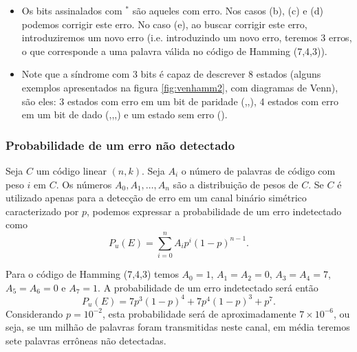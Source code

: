 \begin{frame}[allowframebreaks]
\begin{itemize}
  \item Os bits assinalados com $ ^\ast$ são aqueles com erro. Nos casos (b), (c) e (d) podemos corrigir este erro.
	No caso (e), ao buscar corrigir este erro, introduziremos um novo erro (i.e. introduzindo um novo erro,
	teremos 3 erros, o que corresponde a uma palavra válida no código de Hamming (7,4,3)).

  \item Note que a síndrome com 3 bits é capaz de descrever 8 estados (alguns exemplos apresentados na figura \ref{fig:venhamm2}, com diagramas de Venn),
    são eles: 3 estados com erro em um bit de paridade (\xmark\cmark\cmark,\cmark\xmark\cmark,\cmark\cmark\xmark), 
    4 estados com erro em um bit de dado (\xmark\xmark\cmark,\cmark\xmark\xmark,\xmark\cmark\xmark,\xmark\xmark\xmark) e um estado sem erro (\cmark\cmark\cmark).
  \end{itemize}
\end{frame}

\begin{frame}[allowframebreaks]
  \frametitle{Probabilidade de um erro não detectado}
  Seja $C$ um código linear $(n,k)$. Seja $A_i$ o número de palavras de código com peso $i$ em $C$.
  Os números $A_0,A_1,\ldots,A_n$ são a distribuição de pesos de $C$.
  Se $C$ é utilizado apenas para a detecção de erro em um canal binário simétrico caracterizado por $p$, podemos expressar
  a probabilidade de um erro indetectado como
  \begin{equation}
    P_u(E) = \sum_{i=0}^n A_i p^i (1-p)^{n-1}.
  \end{equation}

  Para o código de Hamming (7,4,3) temos $A_0 = 1$, $A_1 = A_2 = 0$, $A_3 = A_4 = 7$, $A_5 = A_6 = 0$ e $A_7 = 1$.
  A probabilidade de um erro indetectado será então
  \begin{equation}
    P_u(E) = 7 p^3(1-p)^4 + 7 p^4 (1-p)^3 + p^7.
  \end{equation}
  Considerando $p=10^{-2}$, esta probabilidade será de aproximadamente $7 \times 10^{-6}$, ou seja, se um milhão de palavras
  foram transmitidas neste canal, em média teremos sete palavras errôneas não detectadas.
\end{frame}

